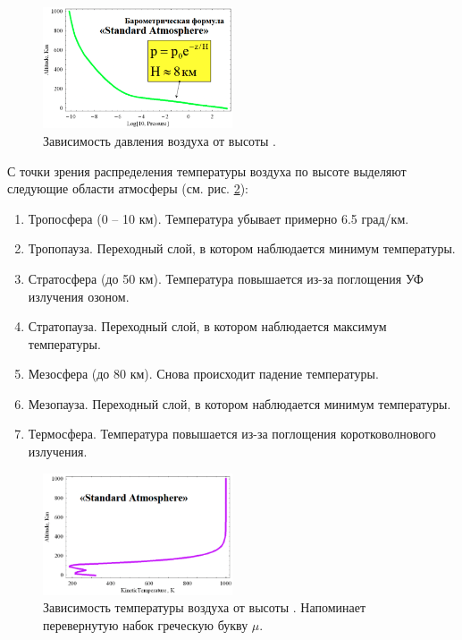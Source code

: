 \begin{figure}[!ht]
\centering
\includegraphics[width=0.5\textwidth]{images/P(z).png}
\caption{Зависимость давления воздуха от высоты \cite{Nosov2019-3}.}\label{fig:P(z)}
\end{figure}

С точки зрения распределения температуры воздуха по высоте выделяют следующие области атмосферы (см. рис. \ref{fig:T(z)}):
\begin{enumerate}
\item Тропосфера (0 -- 10 км). Температура убывает примерно 6.5 град/км.
\item Тропопауза. Переходный слой, в котором наблюдается минимум температуры.
\item Стратосфера (до 50 км). Температура повышается из-за поглощения УФ излучения озоном.
\item Стратопауза. Переходный слой, в котором наблюдается максимум температуры.
\item Мезосфера (до 80 км). Снова происходит падение температуры.
\item Мезопауза. Переходный слой, в котором наблюдается минимум температуры.
\item Термосфера. Температура повышается из-за поглощения коротковолнового излучения.
\end{enumerate}

\begin{figure}[!ht]
\centering
\includegraphics[width=0.5\textwidth]{images/T(z).png}
\caption{Зависимость температуры воздуха от высоты \cite{Nosov2019-3}. Напоминает перевернутую набок греческую букву $\mu$.}\label{fig:T(z)}
\end{figure}
